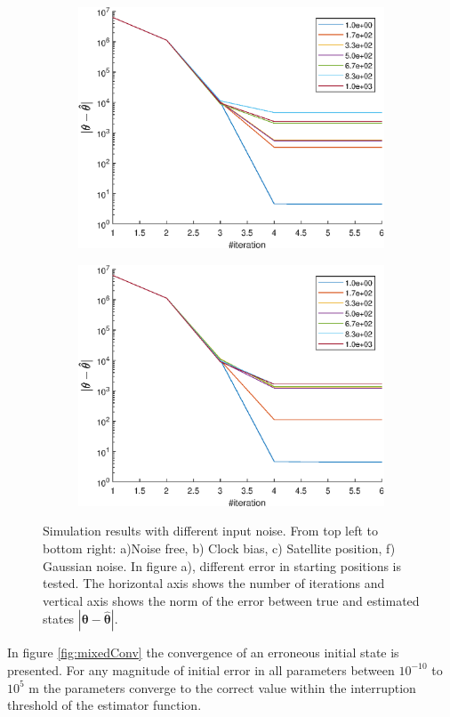 \begin{figure}[!h]
\begin{subfigure}{0.49\textwidth}
  \includegraphics[width=\linewidth]{Results/SimulationEstPos/satPosConv}  
\end{subfigure}
\medskip
\begin{subfigure}{0.49\textwidth}
  \includegraphics[width=\linewidth]{Results/SimulationEstPos/GaussianConv}
\end{subfigure}
\caption{Simulation results with different input noise. From top left to bottom right: a)Noise free, b) Clock bias, c) Satellite position, f) Gaussian noise. In figure a), different error in starting positions is tested. The horizontal axis shows the number of iterations and vertical axis shows the norm of the error between true and estimated states $|{\boldsymbol \theta}-\hat{{\boldsymbol \theta}}|$.} 
\label{fig:sim_est_pos_conv}
\end{figure}
In figure \ref{fig:mixedConv} the convergence of an erroneous initial state is presented. For any magnitude of initial error in all parameters between $10^{-10}$ to $10^5$ m the parameters converge to the correct value within the interruption threshold of the estimator function.

